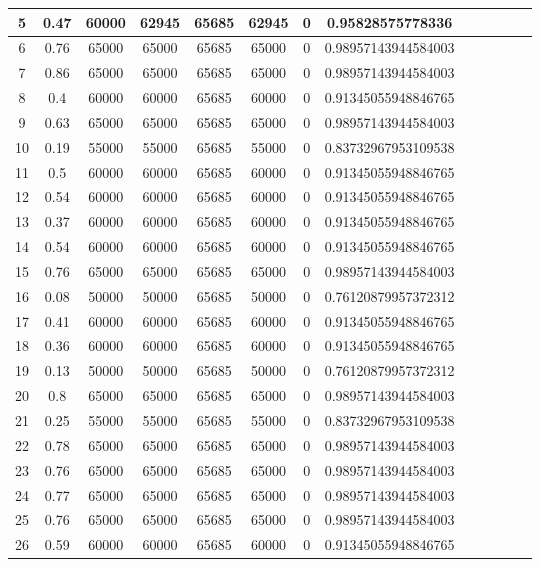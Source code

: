 \documentclass[10pt]{beamer}
\begin{document}
\begin{frame}
\begin{table}
{\begin{tabular}{ | c | c | c | c | c | c | c | c | c | c | c | c | c | }
	5 & 0.47 & 60000 & 62945 & 65685 & 62945 & 0 & 0.95828575778336 \\ \hline
	6 & 0.76 & 65000 & 65000 & 65685 & 65000 & 0 & 0.98957143944584003  \\ \hline
	7 & 0.86 & 65000 & 65000 & 65685 & 65000 & 0 & 0.98957143944584003  \\ \hline
	8 & 0.4 & 60000 & 60000 & 65685 & 60000 & 0 & 0.91345055948846765  \\ \hline
	9 & 0.63 & 65000 & 65000 & 65685 & 65000 & 0 & 0.98957143944584003  \\ \hline
	10 & 0.19 & 55000 & 55000 & 65685 & 55000 & 0 & 0.83732967953109538 \\ \hline
	11 & 0.5 & 60000 & 60000 & 65685 & 60000 & 0 & 0.91345055948846765  \\ \hline
	12 & 0.54 & 60000 & 60000 & 65685 & 60000 & 0 & 0.91345055948846765  \\ \hline
	13 & 0.37 & 60000 & 60000 & 65685 & 60000 & 0 & 0.91345055948846765  \\ \hline
	14 & 0.54 & 60000 & 60000 & 65685 & 60000 & 0 & 0.91345055948846765  \\ \hline
	15 & 0.76 & 65000 & 65000 & 65685 & 65000 & 0 & 0.98957143944584003  \\ \hline
	16 & 0.08 & 50000 & 50000 & 65685 & 50000 & 0 & 0.76120879957372312  \\ \hline
	17 & 0.41 & 60000 & 60000 & 65685 & 60000 & 0 & 0.91345055948846765  \\ \hline
	18 & 0.36 & 60000 & 60000 & 65685 & 60000 & 0 & 0.91345055948846765  \\ \hline
	19 & 0.13 & 50000 & 50000 & 65685 & 50000 & 0 & 0.76120879957372312  \\ \hline
	20 & 0.8 & 65000 & 65000 & 65685 & 65000 & 0 & 0.98957143944584003  \\ \hline
	21 & 0.25 & 55000 & 55000 & 65685 & 55000 & 0 & 0.83732967953109538  \\ \hline
	22 & 0.78 & 65000 & 65000 & 65685 & 65000 & 0 & 0.98957143944584003  \\ \hline
	23 & 0.76 & 65000 & 65000 & 65685 & 65000 & 0 & 0.98957143944584003  \\ \hline
	24 & 0.77 & 65000 & 65000 & 65685 & 65000 & 0 & 0.98957143944584003  \\ \hline
	25 & 0.76 & 65000 & 65000 & 65685 & 65000 & 0 & 0.98957143944584003  \\ \hline
	26 & 0.59 & 60000 & 60000 & 65685 & 60000 & 0 & 0.91345055948846765  \\ \hline

\end{tabular}}
\end{table}
\end{frame}
\end{document}
